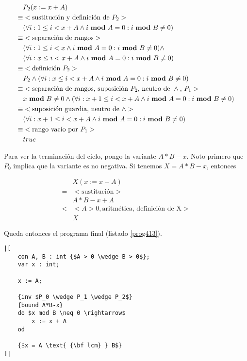 \documentclass{article}
\begin{document}
\begin{align*}
 & P_2(x := x + A) \\
 \equiv & <\text{sustitución y definición de } P_2> \\
 & (\forall i : 1 \leq i < x+A \wedge i \text{ {\bf mod} } A = 0 : i \text{ {\bf mod} } B \neq 0) \\
 \equiv & <\text{separación de rangos}> \\
 & (\forall i : 1 \leq i < x \wedge i \text{ {\bf mod} } A = 0 : i \text{ {\bf mod} } B \neq 0) \wedge \\
 & (\forall i : x \leq i < x+A \wedge i \text{ {\bf mod} } A = 0 : i \text{ {\bf mod} } B \neq 0) \\
 \equiv & <\text{definición } P_2> \\
 & P_2 \wedge (\forall i : x \leq i < x+A \wedge i \text{ {\bf mod} } A = 0 : i \text{ {\bf mod} } B \neq 0) \\
 \equiv & <\text{separación de rangos, suposición } P_2 \text{, neutro de } \wedge \text{, } P_1> \\
 & x \text{ {\bf mod} } B \neq 0 \wedge (\forall i : x+1 \leq i < x+A \wedge i \text{ {\bf mod} } A = 0 : i \text{ {\bf mod} } B \neq 0) \\
 \equiv & <\text{suposición guardia, neutro de } \wedge> \\
 & (\forall i : x+1 \leq i < x+A \wedge i \text{ {\bf mod} } A = 0 : i \text{ {\bf mod} } B \neq 0) \\
 \equiv & <\text{rango vacío por } P_1> \\
 & true
\end{align*}

Para ver la terminación del ciclo, pongo la variante $A*B-x$. Noto primero que
$P_0$ implica que la variante es no negativa. Si tenemos $X = A*B-x$, entonces

\begin{align*}
 & X(x := x + A) \\
 = & <\text{sustitución}> \\
 & A*B-x+A \\
 < & <A > 0, \text{aritmética, definición de X}> \\
 & X
\end{align*}

Queda entonces el programa final (listado \ref{prog413}).

\begin{lstlisting}[float,caption={Solución del ejercicio 4.1.3},label=prog413]
|[
    con A, B : int {$A > 0 \wedge B > 0$};
    var x : int;

    x := A;

    {inv $P_0 \wedge P_1 \wedge P_2$}
    {bound A*B-x}
    do $x mod B \neq 0 \rightarrow$
        x := x + A
    od

    {$x = A \text{ {\bf lcm} } B$}
]|
\end{lstlisting}
\end{document}
